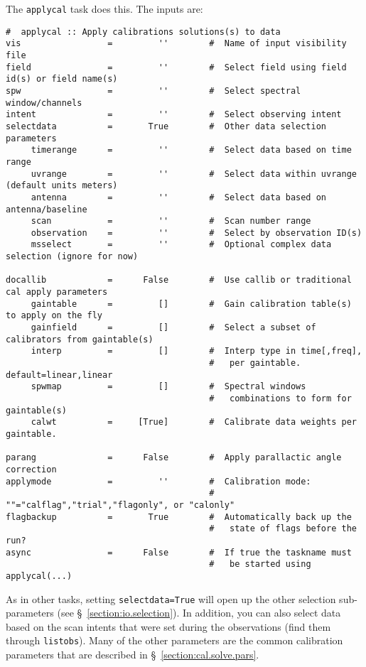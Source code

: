 The {\tt applycal} task does this.  The inputs are:
\small
\begin{verbatim}
#  applycal :: Apply calibrations solutions(s) to data
vis                 =         ''        #  Name of input visibility file
field               =         ''        #  Select field using field id(s) or field name(s)
spw                 =         ''        #  Select spectral window/channels
intent              =         ''        #  Select observing intent
selectdata          =       True        #  Other data selection parameters
     timerange      =         ''        #  Select data based on time range
     uvrange        =         ''        #  Select data within uvrange (default units meters)
     antenna        =         ''        #  Select data based on antenna/baseline
     scan           =         ''        #  Scan number range
     observation    =         ''        #  Select by observation ID(s)
     msselect       =         ''        #  Optional complex data selection (ignore for now)

docallib            =      False        #  Use callib or traditional cal apply parameters
     gaintable      =         []        #  Gain calibration table(s) to apply on the fly
     gainfield      =         []        #  Select a subset of calibrators from gaintable(s)
     interp         =         []        #  Interp type in time[,freq],
                                        #   per gaintable.  default=linear,linear
     spwmap         =         []        #  Spectral windows
                                        #   combinations to form for gaintable(s)
     calwt          =     [True]        #  Calibrate data weights per gaintable.

parang              =      False        #  Apply parallactic angle correction
applymode           =         ''        #  Calibration mode:
                                        #   ""="calflag","trial","flagonly", or "calonly"
flagbackup          =       True        #  Automatically back up the
                                        #   state of flags before the run?
async               =      False        #  If true the taskname must
                                        #   be started using applycal(...)
\end{verbatim}
\normalsize
As in other tasks, setting {\tt selectdata=True} will open up the
other selection sub-parameters (see
\S~\ref{section:io.selection}). In addition, you can also select data
based on the scan intents that were set during the observations (find
them through {\tt listobs}). 
Many of the other parameters are the common calibration parameters
that are described in \S~\ref{section:cal.solve.pars}.

